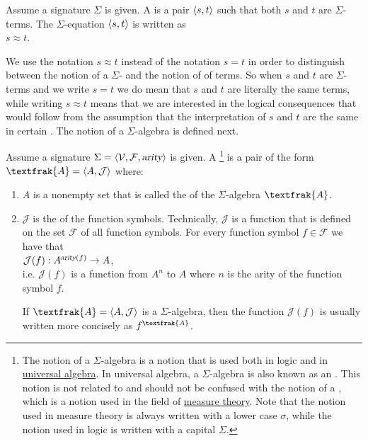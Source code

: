 \begin{Definition}
  Assume a signature $\Sigma$ is given.  A  is a pair $\pair(s,t)$ such
  that both $s$ and $t$ are $\Sigma$-terms.  The $\Sigma$-equation $\pair(s,t)$ is written as
  \\[0.2cm]
  \hspace*{1.3cm}
  $s \approx t$.  \eoxs
\end{Definition}

\remark
We use the notation $s \approx t$ instead of the notation $s=t$ in order to distinguish between the notion of a
$\Sigma$- and the notion of  of terms.  So when $s$ and $t$ are $\Sigma$-terms and we
write $s = t$ we do mean that $s$ and $t$ are literally the same terms, while writing $s \approx t$
means that we are interested in the logical consequences that would follow from the assumption that the
interpretation of $s$ and $t$ are the same in certain .  The notion of a $\Sigma$-algebra
is defined next.  \eoxs

\begin{Definition}
  Assume a signature $\Sigma = \langle \mathcal{V}, \mathcal{F}, \textsl{arity} \rangle$ is given.  A
  \footnote{
    The notion of a $\Sigma$-algebra is a notion that is used both in logic and in
    \href{https://en.wikipedia.org/wiki/Universal_algebra}{universal algebra}.  In universal algebra, a
    $\Sigma$-algebra is also known as an .  This notion is not related to and should
    not be confused with the notion of a , which is a notion used in the field of
    \href{https://en.wikipedia.org/wiki/Measure_(mathematics)}{measure theory}.  Note that the notion used in
    measure theory is always written with a lower case $\sigma$, while the notion used in logic is written with
    a capital $\Sigma$. 
  } is a pair of the form $\textfrak{A} = \pair(A, \mathcal{J})$ where:
  \begin{enumerate}
  \item $A$ is a nonempty set that is called the  of the $\Sigma$-algebra $\textfrak{A}$.
  \item $\mathcal{J}$ is the  of the function symbols.  Technically, $\mathcal{J}$ is a
        function that is defined on the set $\mathcal{F}$ of all function symbols.  For every function symbol
        $f \in \mathcal{F}$ we have that 
        \\[0.2cm]
        \hspace*{1.3cm}
        $\mathcal{J}(f): A^{\textsl{arity}(f)} \rightarrow A$, 
        \\[0.2cm]
        i.e. $\mathcal{J}(f)$ is a function from $A^n$ to $A$ where $n$ is the arity of the function symbol
        $f$.

        If $\textfrak{A} = \pair(A, \mathcal{J})$ is a $\Sigma$-algebra, then the function $\mathcal{J}(f)$ is 
        usually written more concisely as $f^\textfrak{A}$. \eoxs
  \end{enumerate}
\end{Definition}

